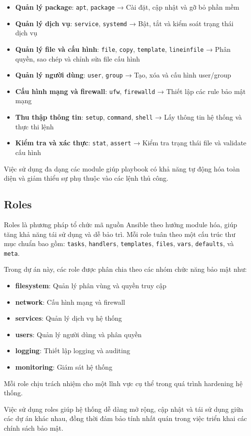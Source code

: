 \begin{itemize}
\item \textbf{Quản lý package}: \texttt{apt}, \texttt{package}  
→ Cài đặt, cập nhật và gỡ bỏ phần mềm

\item \textbf{Quản lý dịch vụ}: \texttt{service}, \texttt{systemd}  
→ Bật, tắt và kiểm soát trạng thái dịch vụ

\item \textbf{Quản lý file và cấu hình}: \texttt{file}, \texttt{copy}, \texttt{template}, \texttt{lineinfile}  
→ Phân quyền, sao chép và chỉnh sửa file cấu hình

\item \textbf{Quản lý người dùng}: \texttt{user}, \texttt{group}  
→ Tạo, xóa và cấu hình user/group

\item \textbf{Cấu hình mạng và firewall}: \texttt{ufw}, \texttt{firewalld}  
→ Thiết lập các rule bảo mật mạng

\item \textbf{Thu thập thông tin}: \texttt{setup}, \texttt{command}, \texttt{shell}  
→ Lấy thông tin hệ thống và thực thi lệnh

\item \textbf{Kiểm tra và xác thực}: \texttt{stat}, \texttt{assert}  
→ Kiểm tra trạng thái file và validate cấu hình
\end{itemize}

\noindent Việc sử dụng đa dạng các module giúp playbook có khả năng tự động hóa toàn diện và giảm thiểu sự phụ thuộc vào các lệnh thủ công.


\subsection{Roles}

\noindent Roles là phương pháp tổ chức mã nguồn Ansible theo hướng module hóa, giúp tăng khả năng tái sử dụng và dễ bảo trì. Mỗi role tuân theo một cấu trúc thư mục chuẩn bao gồm: \texttt{tasks}, \texttt{handlers}, \texttt{templates}, \texttt{files}, \texttt{vars}, \texttt{defaults}, và \texttt{meta}.

\noindent Trong dự án này, các role được phân chia theo các nhóm chức năng bảo mật như:

\begin{itemize}
\item \textbf{filesystem}: Quản lý phân vùng và quyền truy cập
\item \textbf{network}: Cấu hình mạng và firewall
\item \textbf{services}: Quản lý dịch vụ hệ thống
\item \textbf{users}: Quản lý người dùng và phân quyền
\item \textbf{logging}: Thiết lập logging và auditing
\item \textbf{monitoring}: Giám sát hệ thống
\end{itemize}

\noindent Mỗi role chịu trách nhiệm cho một lĩnh vực cụ thể trong quá trình hardening hệ thống.

\noindent Việc sử dụng roles giúp hệ thống dễ dàng mở rộng, cập nhật và tái sử dụng giữa các dự án khác nhau, đồng thời đảm bảo tính nhất quán trong việc triển khai các chính sách bảo mật.